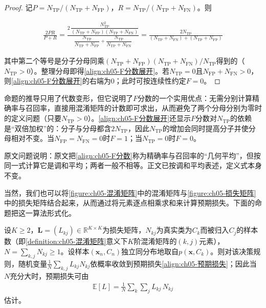 \documentclass[../../main.tex]{subfiles}
\begin{document}
\begin{proof}
记$P=N_{\mathrm{TP}}/(N_{\mathrm{TP}}+N_{\mathrm{FP}})$，$R=N_{\mathrm{TP}}/(N_{\mathrm{TP}}+N_{\mathrm{FN}})$。则

\begin{align}
  \frac{2PR}{P+R}=\frac{2\,\dfrac{N_{\mathrm{TP}}^{2}}{(N_{\mathrm{TP}}+N_{\mathrm{FP}})(N_{\mathrm{TP}}+N_{\mathrm{FN}})}}{\dfrac{N_{\mathrm{TP}}}{N_{\mathrm{TP}}+N_{\mathrm{FP}}}+\dfrac{N_{\mathrm{TP}}}{N_{\mathrm{TP}}+N_{\mathrm{FN}}}}
  =\frac{2N_{\mathrm{TP}}}{(N_{\mathrm{TP}}+N_{\mathrm{FN}})+(N_{\mathrm{TP}}+N_{\mathrm{FP}})}
\end{align}

其中第二个等号是分子分母同乘$(N_{\mathrm{TP}}+N_{\mathrm{FP}})(N_{\mathrm{TP}}+N_{\mathrm{FN}})/N_{\mathrm{TP}}$得到的（$N_{\mathrm{TP}}>0$）。整理分母即得\eqref{align:ch05-F分数展开}。若$N_{\mathrm{TP}}=0$且$N_{\mathrm{FP}}+N_{\mathrm{FN}}>0$，则\eqref{align:ch05-F分数展开}的右端为$0$；此时可按连续性约定$F=0$。
\end{proof}

\begin{remark}
命题的推导只用了代数变形，但它说明了$F$分数的一个实用优点：无需分别计算精确率与召回率，直接用混淆矩阵的计数即可求出，从而避免了两个分母分别为零时的定义问题（只要$N_{\mathrm{TP}}>0$）。\eqref{align:ch05-F分数展开}还显示$F$分数对$N_{\mathrm{TP}}$的依赖是“双倍加权”的：分子与分母都含$2N_{\mathrm{TP}}$，因此$N_{\mathrm{TP}}$的增加会同时提高分子并使分母相对不变。当$N_{\mathrm{FP}}=N_{\mathrm{FN}}=0$时$F=1$；当$N_{\mathrm{TP}}=0$时$F=0$。

原文问题说明：原文把\eqref{align:ch05-F分数}称为精确率与召回率的“几何平均”，但按同一式计算它是调和平均；两者一般不相等。正文已按调和平均表述，定义式本身不变。
\end{remark}

当然，我们也可以将\cref{figure:ch05-混淆矩阵}中的混淆矩阵与\cref{figure:ch05-损失矩阵}中的损失矩阵结合起来，从而通过将元素逐点相乘求和来计算预期损失。下面的命题把这一算法形式化。

\begin{proposition}[由混淆矩阵与损失矩阵计算预期损失]\label{proposition:ch05-混淆损失}
设$K\geqslant2$，$\boldsymbol{L}=(L_{kj})\in\mathbb{R}^{K\times K}$为损失矩阵，$N_{kj}$为真实类为$C_k$而被归入$C_j$的样本数（即\cref{definition:ch05-混淆矩阵}意义下$K$阶混淆矩阵的$(k,j)$元素），$N=\sum_{k,j}N_{kj}\geqslant1$。设样本$(\boldsymbol{x}_n,C_n)$独立同分布地取自$p(\boldsymbol{x},C_k)$。则对该决策规则，随机变量$\frac{1}{N}\sum_{k,j}L_{kj}N_{kj}$依概率收敛到预期损失\eqref{align:ch05-预期损失}；因此当$N$充分大时，预期损失可由
\begin{align}
  \mathbb{E}[L]=\frac{1}{N}\sum_{k}\sum_{j}L_{kj}\,N_{kj}
  \label{align:ch05-混淆损失}
\end{align}
估计。
\end{proposition}
\end{document}
